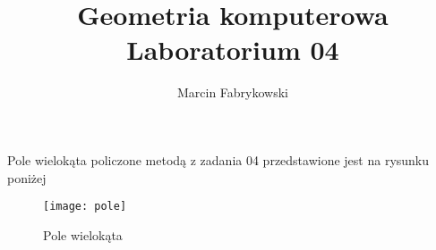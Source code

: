 \documentclass[a4paper, 12pt]{article}
\author{Marcin Fabrykowski}
\title{Geometria komputerowa\\Laboratorium 04}
\begin{document}
\maketitle
\newpage
Pole wielokąta policzone metodą z zadania 04 przedstawione jest na rysunku poniżej

\begin{figure}
\texttt{[image: pole]}
\caption{Pole wielokąta}
\end{figure}
\end{document}
